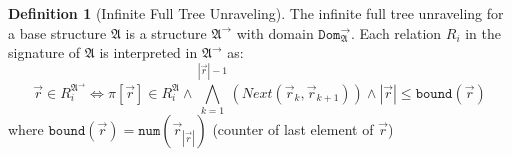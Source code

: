 \documentclass[draft]{scrartcl}
\theoremstyle{definition}
\newtheorem{definition}[theorem]{Definition}
\newcommand{\str}[1]{\mathfrak{#1}}
\newcommand{\num}[1]{\mathtt{num}({#1})}
\newcommand{\dist}[2]{\mathtt{dist}({#1},{#2})}
\newcommand{\nextrel}[2]{\mathit{Next}({#1},{#2})}
\newcommand{\lift}[1]{\mathtt{lift}({#1})}
\begin{document}
\begin{definition}[Infinite Full Tree Unraveling]
  The infinite full tree unraveling for a base structure $\str{A}$ is a structure $\str{A}^{\rightarrow{}}$ with domain $\mathtt{Dom}^{\rightarrow}_{\str{A}}$.
  Each relation $R_{i}$ in the signature of $\str{A}$ is interpreted in $\str{A}^{\rightarrow}$ as:
  \begin{equation*}
    \overrightarrow{r} \in R_{i}^{\str{A}^{\rightarrow}} \iff \pi[\overrightarrow{r}] \in R_{i}^{\str{A}} \land \bigwedge_{k=1}^{|\overrightarrow{r}|-1}{(\nextrel{\overrightarrow{r}_{k}}{\overrightarrow{r}_{k+1}})} \land |\overrightarrow{r}| \le \mathtt{bound}(\overrightarrow{r})
  \end{equation*}
  where $\mathtt{bound}(\overrightarrow{r}) = \num{\overrightarrow{r}_{|\overrightarrow{r}|}}$ (counter of last element of $\overrightarrow{r}$)
\end{definition}


\pagebreak
\end{document}
